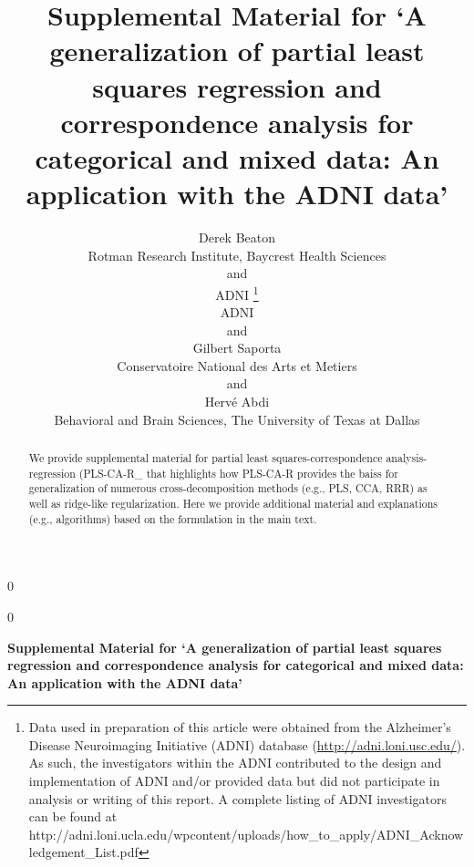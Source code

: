 \documentclass[12pt]{article}
\newcommand{\blind}{0}
\begin{document}
\def\spacingset#1{\renewcommand{\baselinestretch}%
{#1}\small\normalsize} \spacingset{1}



\blind
{
  \title{\bf Supplemental Material for `A generalization of partial least squares
regression and correspondence analysis for categorical and mixed data:
An application with the ADNI data'}

  \author{
        Derek Beaton \\
    Rotman Research Institute, Baycrest Health Sciences\\
     and \\     ADNI \thanks{Data used in preparation of this article were obtained from the
Alzheimer's Disease Neuroimaging Initiative (ADNI) database
(\url{http://adni.loni.usc.edu/}). As such, the investigators within the
ADNI contributed to the design and implementation of ADNI and/or
provided data but did not participate in analysis or writing of this
report. A complete listing of ADNI investigators can be found at
http://adni.loni.ucla.edu/wpcontent/uploads/how\_to\_apply/ADNI\_Acknowledgement\_List.pdf} \\
    ADNI\\
     and \\     Gilbert Saporta \\
    Conservatoire National des Arts et Metiers\\
     and \\     Hervé Abdi \\
    Behavioral and Brain Sciences, The University of Texas at Dallas\\
      }
  \maketitle
} \fi

\blind
{
  \bigskip
  \bigskip
  \bigskip
  \begin{center}
    {\LARGE\bf Supplemental Material for `A generalization of partial least squares
regression and correspondence analysis for categorical and mixed data:
An application with the ADNI data'}
  \end{center}
  \medskip
} \fi

\bigskip
\begin{abstract}
We provide supplemental material for partial least
squares-correspondence analysis-regression (PLS-CA-R\_ that highlights
how PLS-CA-R provides the baiss for generalization of numerous
cross-decomposition methods (e.g., PLS, CCA, RRR) as well as ridge-like
regularization. Here we provide additional material and explanations
(e.g., algorithms) based on the formulation in the main text.
\end{abstract}
\end{document}
